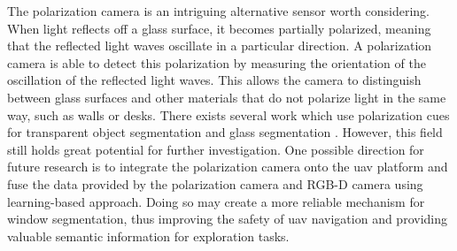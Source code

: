 The polarization camera is an intriguing alternative sensor worth considering. When light reflects off a glass surface, it becomes partially polarized, meaning that the reflected light waves oscillate in a particular direction. A polarization camera is able to detect this polarization by measuring the orientation of the oscillation of the reflected light waves. This allows the camera to distinguish between glass surfaces and other materials that do not polarize light in the same way, such as walls or desks. There exists several work which use polarization cues for transparent object segmentation \cite{deeppolar} and glass segmentation \cite{glasspolar}. However, this field still holds great potential for further investigation. One possible direction for future research is to integrate the polarization camera onto the \gls{uav} platform and fuse the data provided by the polarization camera and RGB-D camera using learning-based approach. Doing so may create a more reliable mechanism for window segmentation, thus improving the safety of \gls{uav} navigation and providing valuable semantic information for exploration tasks.
